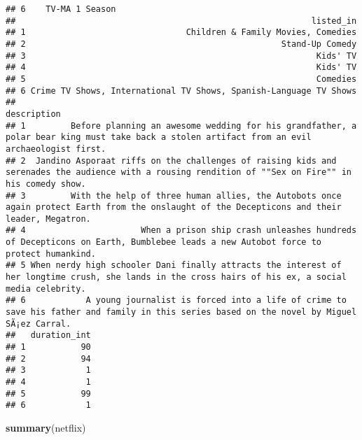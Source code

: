\documentclass[]{article}
\newenvironment{Shaded}{\begin{snugshade}}{\end{snugshade}}
\newcommand{\KeywordTok}[1]{\textcolor[rgb]{0.13,0.29,0.53}{\textbf{#1}}}
\newcommand{\NormalTok}[1]{#1}
\begin{document}
\begin{verbatim}
## 6    TV-MA 1 Season
##                                                           listed_in
## 1                                Children & Family Movies, Comedies
## 2                                                   Stand-Up Comedy
## 3                                                          Kids' TV
## 4                                                          Kids' TV
## 5                                                          Comedies
## 6 Crime TV Shows, International TV Shows, Spanish-Language TV Shows
##                                                                                                                                            description
## 1         Before planning an awesome wedding for his grandfather, a polar bear king must take back a stolen artifact from an evil archaeologist first.
## 2  Jandino Asporaat riffs on the challenges of raising kids and serenades the audience with a rousing rendition of ""Sex on Fire"" in his comedy show.
## 3         With the help of three human allies, the Autobots once again protect Earth from the onslaught of the Decepticons and their leader, Megatron.
## 4                       When a prison ship crash unleashes hundreds of Decepticons on Earth, Bumblebee leads a new Autobot force to protect humankind.
## 5 When nerdy high schooler Dani finally attracts the interest of her longtime crush, she lands in the cross hairs of his ex, a social media celebrity.
## 6            A young journalist is forced into a life of crime to save his father and family in this series based on the novel by Miguel SÃ¡ez Carral.
##   duration_int
## 1           90
## 2           94
## 3            1
## 4            1
## 5           99
## 6            1
\end{verbatim}

\begin{Shaded}
\begin{Highlighting}[]
\KeywordTok{summary}\NormalTok{(netflix)}
\end{Highlighting}
\end{Shaded}
\end{document}
